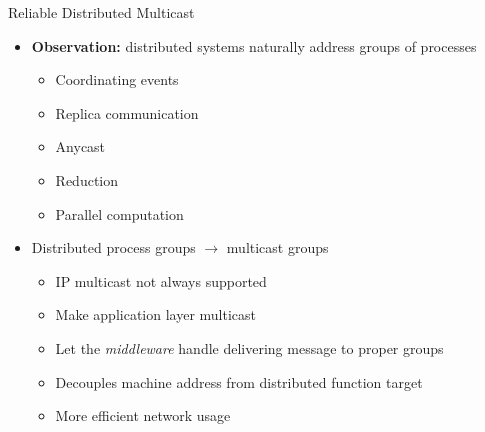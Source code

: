 \documentclass[pdftex]{beamer}
\begin{document}
\begin{frame}{Reliable Distributed Multicast}
\begin{itemize}
	\item \textbf{Observation:} distributed systems naturally address groups of processes
	\begin{itemize}
		\item Coordinating events
		\item Replica communication
		\item Anycast
		\item Reduction
		\item Parallel computation
	\end{itemize}
	
	\item Distributed process groups $\rightarrow$ multicast groups
	\begin{itemize}
		\item IP multicast not always supported
		\item Make application layer multicast
		\item Let the \emph{middleware} handle delivering message to proper groups
		\item Decouples machine address from distributed function target
		\item More efficient network usage
	\end{itemize}
\end{itemize}
\end{frame}


\end{document}
